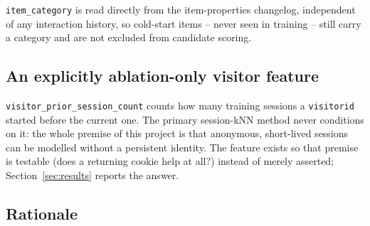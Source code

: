 \texttt{item\_category} is read directly from the item-properties changelog,
independent of any interaction history, so cold-start items -- never seen in
training -- still carry a category and are not excluded from candidate
scoring.

\subsection{An explicitly ablation-only visitor feature}

\texttt{visitor\_prior\_session\_count} counts how many training sessions a
\texttt{visitorid} started before the current one. The primary session-kNN
method never conditions on it: the whole premise of this project is that
anonymous, short-lived sessions can be modelled without a persistent
identity. The feature exists so that premise is testable (does a returning
cookie help at all?) instead of merely asserted; Section~\ref{sec:results}
reports the answer.



\subsection{Rationale}


